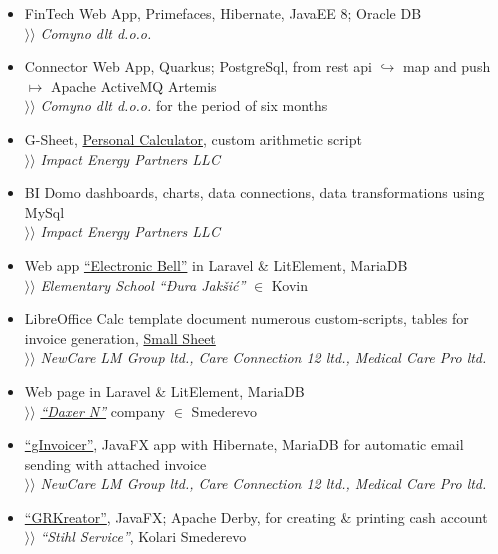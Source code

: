\documentclass[12pt]{article}
\begin{document}
\begin{itemize}[parsep=1.5pt]
\item  FinTech Web App, Primefaces, Hibernate, JavaEE 8; Oracle DB \\
    $\rangle\!\rangle$ \textit{Comyno dlt d.o.o.}
\item Connector Web App, Quarkus; PostgreSql, from rest api $\hookrightarrow$ map and push $\mapsto$ Apache ActiveMQ Artemis \\
    $\rangle\!\rangle$ \textit{Comyno dlt d.o.o.} for the period of six months
\item G-Sheet, \href{https://docs.google.com/spreadsheets/d/1ztJoonmA0d0AyNDwVE1vnjpOPPpM03JF1eWCHwfQ4ZA/edit?usp=sharing}{Personal Calculator}, custom arithmetic script \\
    $\rangle\!\rangle$ \textit{Impact Energy Partners LLC}
\item BI Domo dashboards, charts, data connections, data transformations using MySql \\
    $\rangle\!\rangle$ \textit{Impact Energy Partners LLC}
\item Web app \href{https://zvono.nastavnikinformatike.com}{``Electronic Bell''} in Laravel \& LitElement, MariaDB \\
    $\rangle\!\rangle$ \textit{Elementary School ``Đura Jakšić''} $\in$ Kovin
\item LibreOffice Calc template document numerous custom-scripts, tables for invoice generation, \href{https://docs.google.com/spreadsheets/d/1Hh9O7KoN8RETCPzJl5zVYV3CQdjvu2Qtbiu3tu5O9LY/edit?usp=sharing}{Small Sheet} \\ 
    $\rangle\!\rangle$ \textit{NewCare LM Group ltd., Care Connection 12 ltd., Medical Care Pro ltd.}
\item Web page in Laravel \& LitElement, MariaDB \\
    $\rangle\!\rangle$ \href{https://www.daxern.rs}{\textit{``Daxer N''}} company $\in$ Smederevo
\item \href{https://github.com/goranrsbg/gInvoicer}{``gInvoicer''}, JavaFX app with Hibernate, MariaDB for automatic email sending with attached invoice \\
    $\rangle\!\rangle$ \textit{NewCare LM Group ltd., Care Connection 12 ltd., Medical Care Pro ltd.}
\item \href{https://github.com/goranrsbg/GRKreator}{``GRKreator''}, JavaFX; Apache Derby, for creating \& printing cash account \\
    $\rangle\!\rangle$ \textit{``Stihl Service''}, Kolari Smederevo
\end{itemize}
\end{document}

